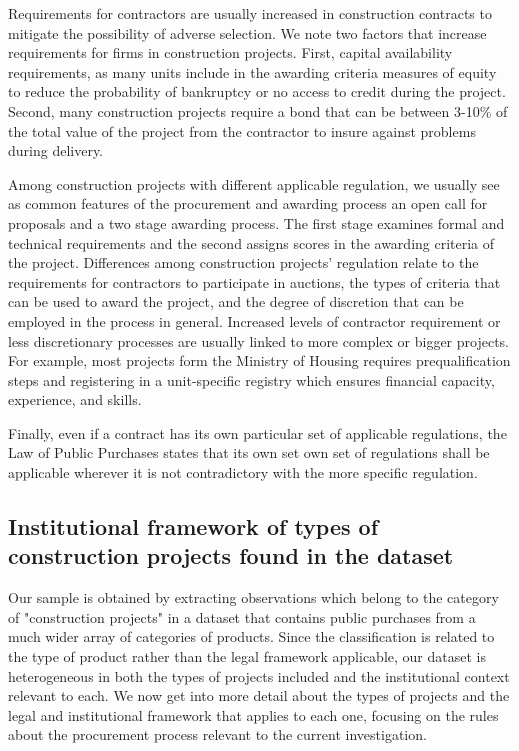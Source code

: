 Requirements for contractors are usually increased in construction contracts to mitigate the possibility of adverse selection. We note two factors that increase requirements for firms in construction projects. First, capital availability requirements, as many units include in the awarding criteria measures of equity to reduce the probability of bankruptcy or no access to credit during the project. Second, many construction projects require a bond that can be between 3-10\% of the total value of the project from the contractor to insure against problems during delivery.

Among construction projects with different applicable regulation, we usually see as common features of the procurement and awarding process an open call for proposals and a two stage awarding process. The first stage examines formal and technical requirements and the second assigns scores in the awarding criteria of the project. Differences among construction projects' regulation relate to the requirements for contractors to participate in auctions, the types of criteria that can be used to award the project, and the degree of discretion that can be employed in the process in general. Increased levels of contractor requirement or less discretionary processes are usually linked to more complex or bigger projects. For example, most projects form the Ministry of Housing requires prequalification steps and registering in a unit-specific registry which ensures financial capacity, experience, and skills.

Finally, even if a contract has its own particular set of applicable regulations, the Law of Public Purchases states that its own set own set of regulations shall be applicable wherever it is not contradictory with the more specific regulation.


\subsection{Institutional framework of types of construction projects found in the dataset}
Our sample is obtained by extracting observations which belong to the category of "construction projects" in a dataset that contains public purchases from a much wider array of categories of products. Since the classification is related to the type of product rather than the legal framework applicable, our dataset is heterogeneous in both the types of projects included and the institutional context relevant to each. We now get into more detail about the types of projects and the legal and institutional framework that applies to each one, focusing on the rules about the procurement process relevant to the current investigation.

